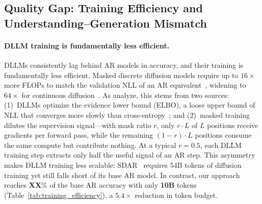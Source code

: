 \subsection{Quality Gap: Training Efficiency and Understanding--Generation Mismatch}
\label{sec:mot_quality}


\paragraph{DLLM training is fundamentally less efficient.}
DLLMs consistently lag behind AR models in accuracy, and their training is fundamentally less efficient. Masked discrete diffusion models require up to $16\times$ more FLOPs to match the validation NLL of an AR equivalent~\citep{nie2024scalingmdlm}, widening to $64\times$ for continuous diffusion~\citep{gulrajani2023plaid}. As \citet{sdar2025} analyze, this stems from two sources: (1)~DLLMs optimize the evidence lower bound (ELBO), a loose upper bound of NLL that converges more slowly than cross-entropy~\citep{nie2024scalingmdlm, feng2025theoretical}; and (2)~masked training dilutes the supervision signal---with mask ratio $r$, only $r \cdot L$ of $L$ positions receive gradients per forward pass, while the remaining $(1{-}r) \cdot L$ positions consume the same compute but contribute nothing. At a typical $r{=}0.5$, each DLLM training step extracts only half the useful signal of an AR step. This asymmetry makes DLLM training less scalable: SDAR~\citep{sdar2025} requires 54B tokens of diffusion training yet still falls short of its base AR model. In contrast, our approach reaches \textbf{XX}\% of the base AR accuracy with only \textbf{10B} tokens (Table~\ref{tab:training_efficiency}), a $5.4\times$ reduction in token budget.

